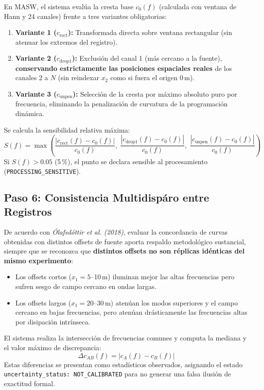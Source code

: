 \documentclass[11pt,a4paper]{article}
\begin{document}
En MASW, el sistema evalúa la cresta base $c_0(f)$ (calculada con ventana de Hann y 24 canales) frente a tres variantes obligatorias:
\begin{enumerate}
    \item \textbf{Variante 1 ($c_{\text{rect}}$):} Transformada directa sobre ventana rectangular (sin atenuar los extremos del registro).
    \item \textbf{Variante 2 ($c_{\text{drop1}}$):} Exclusión del canal 1 (más cercano a la fuente), \textbf{conservando estrictamente las posiciones espaciales reales} de los canales 2 a $N$ (sin reindexar $x_2$ como si fuera el origen 0\,m).
    \item \textbf{Variante 3 ($c_{\text{unpen}}$):} Selección de la cresta por máximo absoluto puro por frecuencia, eliminando la penalización de curvatura de la programación dinámica.
\end{enumerate}
Se calcula la sensibilidad relativa máxima:
\begin{equation}
    S(f) = \max \left( \frac{|c_{\text{rect}}(f) - c_0(f)|}{c_0(f)}, \; \frac{|c_{\text{drop1}}(f) - c_0(f)|}{c_0(f)}, \; \frac{|c_{\text{unpen}}(f) - c_0(f)|}{c_0(f)} \right)
\end{equation}
Si $S(f) > 0.05$ (5\,\%), el punto se declara sensible al procesamiento (\texttt{PROCESSING\_SENSITIVE}).

\subsection{Paso 6: Consistencia Multidispáro entre Registros}
De acuerdo con \emph{Ólafsdóttir et al. (2018)}, evaluar la concordancia de curvas obtenidas con distintos offsets de fuente aporta respaldo metodológico sustancial, siempre que se reconozca que \textbf{distintos offsets no son réplicas idénticas del mismo experimento}:
\begin{itemize}
    \item Los offsets cortos ($x_1 = 5$--10\,m) iluminan mejor las altas frecuencias pero sufren sesgo de campo cercano en ondas largas.
    \item Los offsets largos ($x_1 = 20$--30\,m) atenúan los modos superiores y el campo cercano en bajas frecuencias, pero atenúan drásticamente las frecuencias altas por disipación intrínseca.
\end{itemize}
El sistema realiza la intersección de frecuencias comunes y computa la mediana y el valor máximo de discrepancia:
\begin{equation}
    \Delta c_{AB}(f) = |c_A(f) - c_B(f)|
\end{equation}
Estas diferencias se presentan como estadísticos observados, asignando el estado \texttt{uncertainty\_status: NOT\_CALIBRATED} para no generar una falsa ilusión de exactitud formal.
\end{document}
